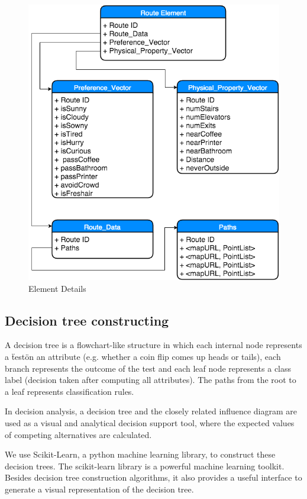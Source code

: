 \documentclass{sigchi}
\begin{document}
\begin{figure}[!h]
\centering
\includegraphics[width=1.0\columnwidth]{pics/element-detail.png}
\caption{Element Details}
\label{fig:element-detail}
\end{figure}

\subsection{Decision tree constructing}

A decision tree is a flowchart-like structure in which each internal node represents a \"test\" on an attribute (e.g. whether a coin flip comes up heads or tails), each branch represents the outcome of the test and each leaf node represents a class label (decision taken after computing all attributes). The paths from the root to a leaf represents classification rules.


In decision analysis, a decision tree and the closely related influence diagram are used as a visual and analytical decision support tool, where the expected values of competing alternatives are calculated.


We use Scikit-Learn, a python machine learning library, to construct these decision trees. The scikit-learn library is a powerful machine learning toolkit. Besides decision tree construction algorithms, it also provides a useful interface to generate a visual representation of the decision tree.
\end{document}
